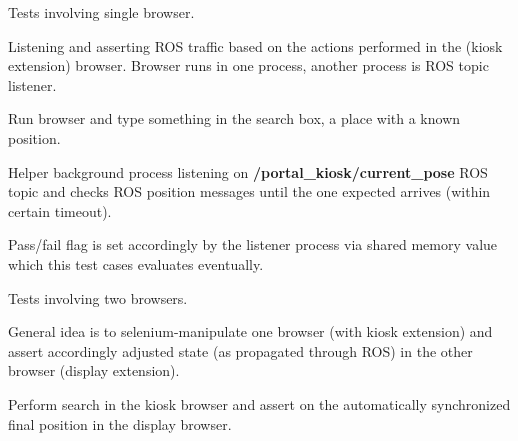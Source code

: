 \documentclass[letterpaper,10pt,english]{sphinxmanual}
\begin{document}
\begin{fulllineitems}
\label{test_ros:test_ros.TestBaseSingleBrowserROS}
Tests involving single browser.

Listening and asserting ROS traffic based on the actions performed in
the (kiosk extension) browser. Browser runs in one process, another
process is ROS topic listener.

\begin{fulllineitems}
\label{test_ros:test_ros.TestBaseSingleBrowserROS.test_ros_position_after_search}
Run browser and type something in the search box, a place with
a known position.

Helper background process listening on \textbf{/portal\_kiosk/current\_pose}
ROS topic and checks ROS position messages until the one expected
arrives (within certain timeout).

Pass/fail flag is set accordingly by the listener process via
shared memory value which this test cases evaluates eventually.

\end{fulllineitems}


\end{fulllineitems}


\begin{fulllineitems}
\label{test_ros:test_ros.TestBaseTwoBrowsersROS}
Tests involving two browsers.

General idea is to selenium-manipulate one browser (with kiosk
extension) and assert accordingly adjusted state (as propagated
through ROS) in the other browser (display extension).

\begin{fulllineitems}
\label{test_ros:test_ros.TestBaseTwoBrowsersROS.test_ros_positions_in_browsers_aligned_after_kiosk_search}
Perform search in the kiosk browser and assert on the automatically
synchronized final position in the display browser.

\end{fulllineitems}


\end{fulllineitems}
\end{document}
